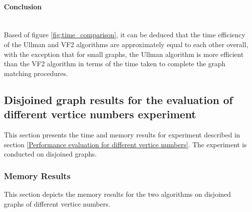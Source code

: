 \paragraph{Conclusion}\mbox{}\\
Based of figure \ref{fig:time_comparison}, it can be deduced that the time efficiency of the Ullman and VF2 algorithms are approximately equal to each other overall,
with the exception that for small graphs, the Ullman algorithm is more efficient than the VF2 algorithm in terms of the time taken to complete the graph matching
procedures.

\newpage

\subsection{Disjoined graph results for the evaluation of different vertice numbers experiment}
This section presents the time and memory results for experiment described in section \ref{Performance evaluation for different vertice numbers}. The 
experiment is conducted on disjoined graphs.
\subsubsection{Memory Results}
This section depicts the memory results for the two algorithms on disjoined graphs of different vertice numbers.